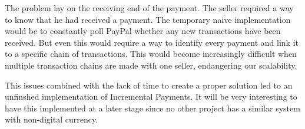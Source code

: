 The problem lay on the receiving end of the payment.
The seller required a way to know that he had received a payment.
The temporary naive implementation would be to constantly poll PayPal whether any new transactions have been received.
But even this would require a way to identify every payment and link it to a specific chain of transactions.
This would become increasingly difficult when multiple transaction chains are made with one seller, endangering our scalability.

This issues combined with the lack of time to create a proper solution led to an unfinshed implementation of Incremental Payments.
It will be very interesting to have this implemented at a later stage since no other project has a similar system with non-digital currency.